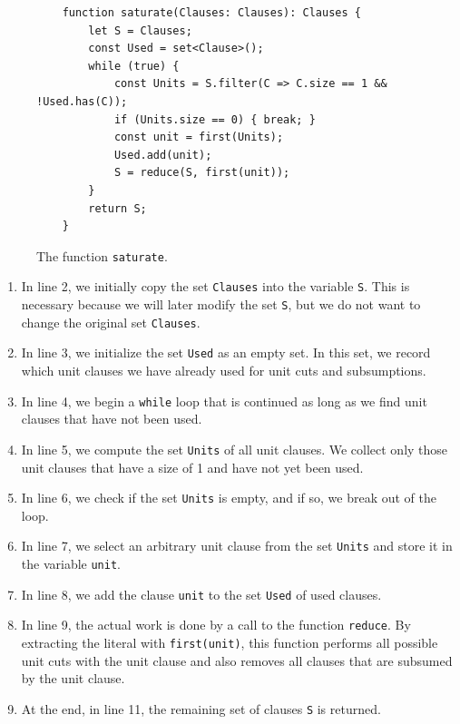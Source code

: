 \begin{figure}[!ht]
  \centering
\begin{verbatim}
    function saturate(Clauses: Clauses): Clauses {
        let S = Clauses;
        const Used = set<Clause>(); 
        while (true) {
            const Units = S.filter(C => C.size == 1 && !Used.has(C));
            if (Units.size == 0) { break; }
            const unit = first(Units);
            Used.add(unit);
            S = reduce(S, first(unit));
        }
        return S;
    }
\end{verbatim}
\vspace*{-0.3cm}
  \caption{The function \texttt{saturate}. }
  \label{fig:saturate}
\end{figure} 
\begin{enumerate}
\item In line 2, we initially copy the set \texttt{Clauses} into the variable \texttt{S}. This is necessary
  because we will later modify the set \texttt{S}, but we do not want to change the original set \texttt{Clauses}.
\item In line 3, we initialize the set \texttt{Used} as an empty set. In this set, we record which unit clauses
  we have already used for unit cuts and subsumptions. 
\item In line 4, we begin a \texttt{while} loop that is continued as long as we find unit clauses that have not been used.
\item In line 5, we compute the set \texttt{Units} of all unit clauses. We collect only those unit clauses that have a size of 1 and have not yet been used.
\item In line 6, we check if the set \texttt{Units} is empty, and if so, we break out of the loop.
\item In line 7, we select an arbitrary unit clause from the set \texttt{Units} and store it in the variable \texttt{unit}.
\item In line 8, we add the clause \texttt{unit} to the set \texttt{Used} of used clauses.
\item In line 9, the actual work is done by a call to the function \texttt{reduce}. By extracting the literal with \texttt{first(unit)}, this function performs all possible unit cuts with the unit clause and also removes all clauses that are subsumed by the unit clause.
\item At the end, in line 11, the remaining set of clauses \texttt{S} is returned.
\end{enumerate}



